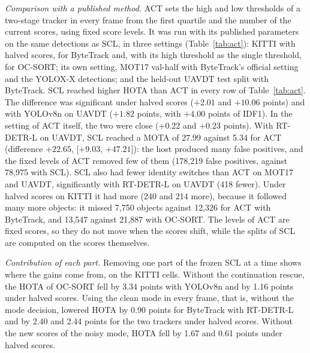 \documentclass[pdflatex,sn-mathphys-num,iicol]{sn-jnl}
\newcommand{\scl}{SCL}
\begin{document}
\emph{Comparison with a published method.} ACT \cite{act2026adaptive} sets the high and low
thresholds of a two-stage tracker in every frame from the first quartile and the number of the
current scores, using fixed score levels. It was run with its published parameters on the same
detections as \scl{}, in three settings (Table~\ref{tab:act}): KITTI with halved scores, for
ByteTrack and, with its high threshold as the single threshold, for OC-SORT; its own setting, MOT17
val-half with ByteTrack's official setting and the YOLOX-X detections; and the held-out UAVDT test
split with ByteTrack. \scl{} reached higher HOTA than ACT in every row of Table~\ref{tab:act}. The
difference was significant under halved scores ($+2.01$ and $+10.06$ points) and with YOLOv8n on
UAVDT ($+1.82$ points, with $+4.00$ points of IDF1). In the setting of ACT itself, the two were
close ($+0.22$ and $+0.23$ points). With RT-DETR-L on UAVDT, \scl{} reached a MOTA of 27.99 against
5.34 for ACT (difference $+22.65$, [$+9.03$, $+47.21$]): the host produced many false positives,
and the fixed levels of ACT removed few of them (178,219 false positives, against 78,975 with
\scl{}). \scl{} also had fewer identity switches than ACT on MOT17 and UAVDT, significantly with
RT-DETR-L on UAVDT (418 fewer). Under halved scores on KITTI it had more (240 and 214 more), because
it followed many more objects: it missed 7,750 objects against 12,326 for ACT with ByteTrack, and
13,547 against 21,887 with OC-SORT. The levels of ACT are fixed scores, so they do not move when the
scores shift, while the splits of \scl{} are computed on the scores themselves.

\emph{Contribution of each part.} Removing one part of the frozen \scl{} at a time shows where the
gains come from, on the KITTI cells. Without the continuation rescue, the HOTA of OC-SORT fell by
3.34 points with YOLOv8n and by 1.16 points under halved scores. Using the clean mode in every
frame, that is, without the mode decision, lowered HOTA by 0.90 points for ByteTrack with RT-DETR-L
and by 2.40 and 2.44 points for the two trackers under halved scores. Without the new scores of the
noisy mode, HOTA fell by 1.67 and 0.61 points under halved scores.
\end{document}
